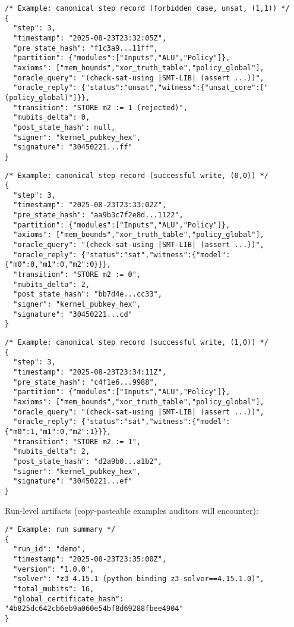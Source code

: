 \documentclass[11pt]{article}
\begin{document}
\begin{verbatim}
/* Example: canonical step record (forbidden case, unsat, (1,1)) */
{
  "step": 3,
  "timestamp": "2025-08-23T23:32:05Z",
  "pre_state_hash": "f1c3a9...11ff",
  "partition": {"modules":["Inputs","ALU","Policy"]},
  "axioms": ["mem_bounds","xor_truth_table","policy_global"],
  "oracle_query": "(check-sat-using |SMT-LIB| (assert ...))",
  "oracle_reply": {"status":"unsat","witness":{"unsat_core":["(policy_global)"]}},
  "transition": "STORE m2 := 1 (rejected)",
  "mubits_delta": 0,
  "post_state_hash": null,
  "signer": "kernel_pubkey_hex",
  "signature": "30450221...ff"
}
\end{verbatim}

\begin{verbatim}
/* Example: canonical step record (successful write, (0,0)) */
{
  "step": 3,
  "timestamp": "2025-08-23T23:33:02Z",
  "pre_state_hash": "aa9b3c7f2e8d...1122",
  "partition": {"modules":["Inputs","ALU","Policy"]},
  "axioms": ["mem_bounds","xor_truth_table","policy_global"],
  "oracle_query": "(check-sat-using |SMT-LIB| (assert ...))",
  "oracle_reply": {"status":"sat","witness":{"model":{"m0":0,"m1":0,"m2":0}}},
  "transition": "STORE m2 := 0",
  "mubits_delta": 2,
  "post_state_hash": "bb7d4e...cc33",
  "signer": "kernel_pubkey_hex",
  "signature": "30450221...cd"
}
\end{verbatim}

\begin{verbatim}
/* Example: canonical step record (successful write, (1,0)) */
{
  "step": 3,
  "timestamp": "2025-08-23T23:34:11Z",
  "pre_state_hash": "c4f1e6...9988",
  "partition": {"modules":["Inputs","ALU","Policy"]},
  "axioms": ["mem_bounds","xor_truth_table","policy_global"],
  "oracle_query": "(check-sat-using |SMT-LIB| (assert ...))",
  "oracle_reply": {"status":"sat","witness":{"model":{"m0":1,"m1":0,"m2":1}}},
  "transition": "STORE m2 := 1",
  "mubits_delta": 2,
  "post_state_hash": "d2a9b0...a1b2",
  "signer": "kernel_pubkey_hex",
  "signature": "30450221...ef"
}
\end{verbatim}

Run-level artifacts (copy-pasteable examples auditors will encounter):

\begin{verbatim}
/* Example: run summary */
{
  "run_id": "demo",
  "timestamp": "2025-08-23T23:35:00Z",
  "version": "1.0.0",
  "solver": "z3 4.15.1 (python binding z3-solver==4.15.1.0)",
  "total_mubits": 16,
  "global_certificate_hash": "4b825dc642cb6eb9a060e54bf8d69288fbee4904"
}
\end{verbatim}
\end{document}
